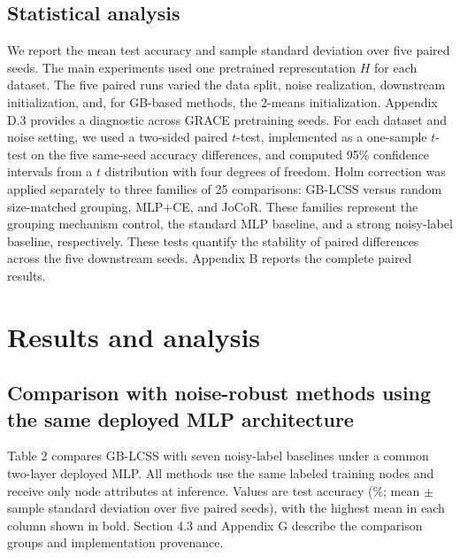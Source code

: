 \documentclass[preprint,12pt]{elsarticle}
\begin{document}
\subsection{Statistical analysis}\label{sec:4.5}

We report the mean test accuracy and sample standard deviation over five paired seeds. The main experiments used one pretrained representation \(H\) for each dataset. The five paired runs varied the data split, noise realization, downstream initialization, and, for GB-based methods, the 2-means initialization. Appendix D.3 provides a diagnostic across GRACE pretraining seeds. For each dataset and noise setting, we used a two-sided paired \(t\)-test, implemented as a one-sample \(t\)-test on the five same-seed accuracy differences, and computed 95\% confidence intervals from a \(t\) distribution with four degrees of freedom. Holm correction was applied separately to three families of 25 comparisons: GB-LCSS versus random size-matched grouping, MLP+CE, and JoCoR. These families represent the grouping mechanism control, the standard MLP baseline, and a strong noisy-label baseline, respectively. These tests quantify the stability of paired differences across the five downstream seeds. Appendix B reports the complete paired results.

\Needspace{418pt}

\FloatBarrier

\section{Results and analysis}\label{sec:5}

\Needspace{403pt}

\subsection{Comparison with noise-robust methods using the same deployed MLP architecture}\label{sec:5.1}

Table 2 compares GB-LCSS with seven noisy-label baselines under a common two-layer deployed MLP. All methods use the same labeled training nodes and receive only node attributes at inference. Values are test accuracy (\%; mean \ensuremath{\pm} sample standard deviation over five paired seeds), with the highest mean in each column shown in bold. Section 4.3 and Appendix G describe the comparison groups and implementation provenance.
\end{document}
